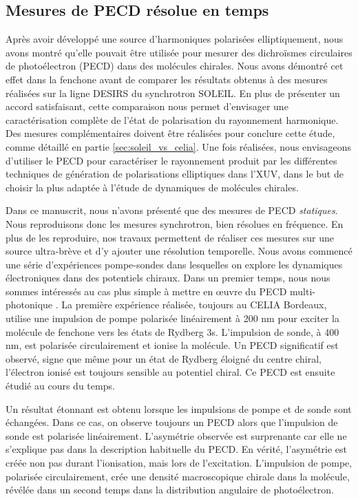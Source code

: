 \subsection{Mesures de PECD résolue en temps}
Après avoir développé une source d'harmoniques polarisées elliptiquement, nous avons montré qu'elle pouvait être utilisée pour mesurer des dichroïsmes circulaires de photoélectron (PECD) dans des molécules chirales. Nous avons démontré cet effet dans la fenchone avant de comparer les résultats obtenus à des mesures réalisées sur la ligne DESIRS du synchrotron SOLEIL. En plus de présenter un accord satisfaisant, cette comparaison nous permet d'envisager une caractérisation complète de l'état de polarisation du rayonnement harmonique. Des mesures complémentaires doivent être réalisées pour conclure cette étude, comme détaillé en partie \ref{sec:soleil_vs_celia}. Une fois réalisées, nous envisageons d'utiliser le PECD pour caractériser le rayonnement produit par les différentes techniques de génération de polarisations elliptiques dans l'XUV, dans le but de choisir la plus adaptée à l'étude de dynamiques de molécules chirales.

Dans ce manuscrit, nous n'avons présenté que des mesures de PECD \textit{statiques}. Nous reproduisons donc les mesures synchrotron, bien résolues en fréquence. En plus de les reproduire, nos travaux permettent de réaliser ces mesures sur une source ultra-brève et d'y ajouter une résolution temporelle. Nous avons commencé une série d'expériences pompe-sondes dans lesquelles on explore les dynamiques électroniques dans des potentiels chiraux. Dans un premier temps, nous nous sommes intéressés au cas plus simple à mettre en œuvre du PECD multi-photonique . La première expérience réalisée, toujours au CELIA Bordeaux, utilise une impulsion de pompe polarisée linéairement à 200 nm pour exciter la molécule de fenchone vers les états de Rydberg 3s. L'impulsion de sonde, à 400 nm, est polarisée circulairement et ionise la molécule. Un PECD significatif est observé, signe que même pour un état de Rydberg éloigné du centre chiral, l'électron ionisé est toujours sensible au potentiel chiral. Ce PECD est ensuite étudié au cours du temps.

Un résultat étonnant est obtenu lorsque les impulsions de pompe et de sonde sont échangées. Dans ce cas, on observe toujours un PECD alors que l'impulsion de sonde est polarisée linéairement. L'asymétrie observée est surprenante car elle ne s'explique pas dans la description habituelle du PECD. En vérité, l'asymétrie est créée non pas durant l'ionisation, mais lors de l'excitation. L'impulsion de pompe, polarisée circulairement, crée une densité macroscopique chirale dans la molécule, révélée dans un second temps dans la distribution angulaire de photoélectron. 

